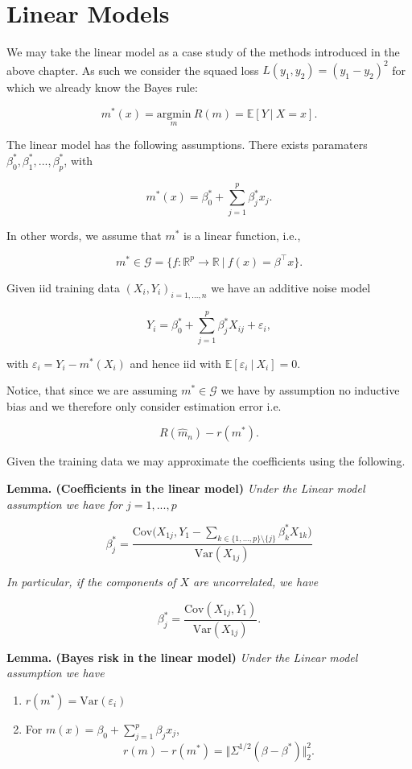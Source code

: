 \documentclass[a4paper,10pt,openany]{book}
\providecommand{\tightlist}{%
 \setlength{\itemsep}{0pt}\setlength{\parskip}{0pt}}
\begin{document}
\hypertarget{linear-models}{%
\section{Linear Models}\label{linear-models}}

We may take the linear model as a case study of the methods introduced in the above chapter. As such we consider the squaed loss \(L(y_1,y_2)=(y_1-y_2)^2\) for which we already know the Bayes rule:

\[
m^*(x)=\underset{m}{\text{argmin}}\ R(m)=\mathbb{E}[Y\ \vert\ X=x].
\]

The linear model has the following assumptions. There exists paramaters \(\beta_0^*,\beta_1^*,...,\beta_p^*\), with

\[
m^*(x)=\beta_0^*+\sum_{j=1}^{p}\beta_j^*x_j.
\]

In other words, we assume that \(m^*\) is a linear function, i.e.,

\[
m^*\in\mathcal{G}=\{f : \mathbb{R}^p\to \mathbb{R}\ \vert\ f(x)=\beta^\top x\}.
\]

Given iid training data \((X_i,Y_i)_{i=1,...,n}\) we have an additive noise model

\[
Y_i=\beta_0^*+\sum_{j=1}^{p}\beta_j^*X_{ij}+\varepsilon_i,
\]

with \(\varepsilon_i=Y_i-m^*(X_i)\) and hence iid with \(\mathbb{E}[\varepsilon_i\ \vert\ X_i]=0\).

Notice, that since we are assuming \(m^*\in\mathcal{G}\) we have by assumption no inductive bias and we therefore only consider estimation error i.e.

\[
R(\hat{m}_n)-r(m^*).
\]

Given the training data we may approximate the coefficients using the following.

\textbf{Lemma. (Coefficients in the linear model)} \emph{Under the Linear model assumption we have for \(j=1,...,p\)}

\[
\beta^*_j=\frac{\text{Cov}\Big(X_{1j},Y_1-\sum_{k\in \{1,...,p\}\setminus \{j\}} \beta_k^*X_{1k}\Big)}{\text{Var}(X_{1j})}
\]

\emph{In particular, if the components of \(X\) are uncorrelated, we have}

\[
\beta_j^*=\frac{\text{Cov}(X_{1j},Y_1)}{\text{Var}(X_{1j})}.
\]

\textbf{Lemma. (Bayes risk in the linear model)} \emph{Under the Linear model assumption we have}

\begin{enumerate}
\def\labelenumi{\arabic{enumi}.}
\tightlist
\item
  \(r(m^*)=\text{Var}(\varepsilon_i)\)
\item
  For \(m(x)=\beta_0+\sum_{j=1}^p \beta_jx_j\),
  \[
    r(m)-r(m^*)=\Vert\Sigma^{1/2}(\beta -\beta^*) \Vert^2_2.
    \]
\end{enumerate}
\end{document}

